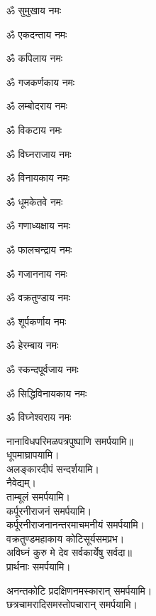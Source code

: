 \begin{enumerate}%
\begin{minipage}{0.475\linewidth}
\item ॐ सुमुखाय नमः
\item ॐ एकदन्ताय नमः
\item ॐ कपिलाय नमः
\item ॐ गजकर्णकाय नमः
\item ॐ लम्बोदराय नमः
\item ॐ विकटाय नमः
\item ॐ विघ्नराजाय नमः
\item ॐ विनायकाय नमः
\item ॐ धूमकेतवे नमः
  \end{minipage}
  \begin{minipage}{0.525\linewidth}
\item ॐ गणाध्यक्षाय नमः
\item ॐ फालचन्द्राय नमः
\item ॐ गजाननाय नमः
\item ॐ वक्रतुण्डाय नमः
\item ॐ शूर्पकर्णाय नमः
\item ॐ हेरम्बाय नमः
\item ॐ स्कन्दपूर्वजाय नमः
\item ॐ सिद्धिविनायकाय नमः
\item ॐ विघ्नेश्वराय नमः
  \end{minipage}
\end{enumerate}
नानाविधपरिमळपत्रपुष्पाणि समर्पयामि॥\\
धूपमाघ्रापयामि।\\
अलङ्कारदीपं सन्दर्शयामि।\\
नैवेद्यम्।\\
ताम्बूलं समर्पयामि।\\
कर्पूरनीराजनं समर्पयामि।\\
कर्पूरनीराजनानन्तरमाचमनीयं समर्पयामि।\\
{वक्रतुण्डमहाकाय कोटिसूर्यसमप्रभ।}\\
{अविघ्नं कुरु मे देव सर्वकार्येषु सर्वदा॥}\\
प्रार्थनाः समर्पयामि।

अनन्तकोटि प्रदक्षिणनमस्कारान् समर्पयामि।\\
छत्रचामरादिसमस्तोपचारान् समर्पयामि।\\


